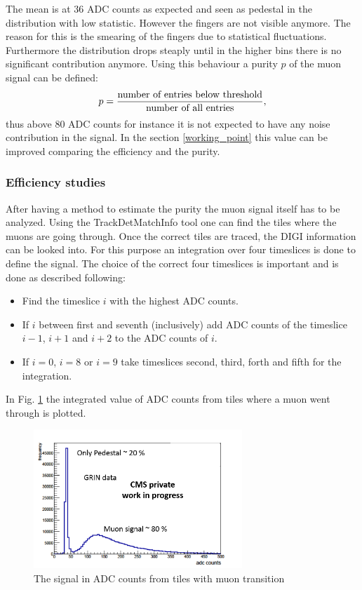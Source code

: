 			The mean is at 36 ADC counts as expected and seen as pedestal in the distribution with low statistic.
			However the fingers are not visible anymore.
			The reason for this is the smearing of the fingers due to statistical fluctuations.
			Furthermore the distribution drops steaply until in the higher bins there is no significant contribution anymore.
			Using this behaviour a purity $p$ of the muon signal can be defined:
			\begin{equation}
				p = \frac{\textnormal{number of entries below threshold}}{\textnormal{number of all entries}},
			\end{equation}
			thus above 80 ADC counts for instance it is not expected to have any noise contribution in the signal.
			In the section \ref{working_point} this value can be improved comparing the efficiency and the purity.
		\subsubsection{Efficiency studies}
			After having a method to estimate the purity the muon signal itself has to be analyzed.
			Using the TrackDetMatchInfo tool one can find the tiles where the muons are going through.
			Once the correct tiles are traced, the DIGI information can be looked into.
			For this purpose an integration over four timeslices is done to define the signal.
			The choice of the correct four timeslices is important and is done as described following:
			\begin{itemize}
			  \item Find the timeslice $i$ with the highest ADC counts.
			  \item If $i$ between first and seventh (inclusively) add ADC counts of the timeslice $i-1$, $i+1$ and $i+2$ to the ADC counts of $i$.
			  \item If $i=0$, $i=8$ or $i=9$ take timeslices second, third, forth and fifth for the integration.
			\end{itemize}
			In Fig. \ref{fig:efficiency1x1} the integrated value of ADC counts from tiles where a muon went through is plotted.
			\begin{figure}[htbp]
				\centering
				\includegraphics[width=0.70\textwidth]{Figures/erdogan/efficiency1x1.png}
				\caption{The signal in ADC counts from tiles with muon transition}
				\label{fig:efficiency1x1}
			\end{figure}
